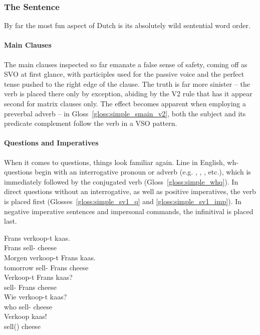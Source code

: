 \subsubsection{The Sentence}
By far the most fun aspect of Dutch is its absolutely wild sentential word order.

\paragraph{Main Clauses}
The main clauses inspected so far emanate a false sense of safety, coming off as SVO at first glance, with participles used for the passive voice and the perfect tense pushed to the right edge of the clause.
The truth is far more sinister -- the verb is placed there only by exception, abiding by the V2 rule that has it appear second for matrix clauses only.
The effect becomes apparent when employing a preverbal adverb -- in Gloss~\ref{gloss:simple_smain_v2}, both the subject and its predicate complement follow the verb in a VSO pattern.


\paragraph{Questions and Imperatives}
When it comes to questions, things look familiar again.
Line in English, wh-questions begin with an interrogative pronoun or adverb (e.g. , , ,  etc.), which is immediately followed by the conjugated verb (Gloss~\ref{gloss:simple_whq}).
In direct questions without an interrogative, as well as positive imperatives, the verb is placed first (Glosses~\ref{gloss:simple_sv1_q} and \ref{gloss:simple_sv1_imp}).
In negative imperative sentences and impersonal commands, the infinitival is placed last.

\begin{exe}
\ex
\begin{xlist}
\ex\label{gloss:simple_smain}
\gll Frans verkoop-t kaas.\\
Frans sell- cheese\\
\ex\label{gloss:simple_smain_v2}
\gll Morgen verkoop-t Frans kaas.\\
tomorrow sell- Frans cheese\\
\ex\label{gloss:simple_sv1_q}
\gll Verkoop-t Frans kaas?\\
sell- Frans cheese\\
\ex\label{gloss:simple_whq}
\gll Wie verkoop-t kaas?\\
who sell- cheese\\
\ex\label{gloss:simple_sv1_imp}
\gll Verkoop kaas!\\
sell() cheese\\
\end{xlist}
\end{exe}

